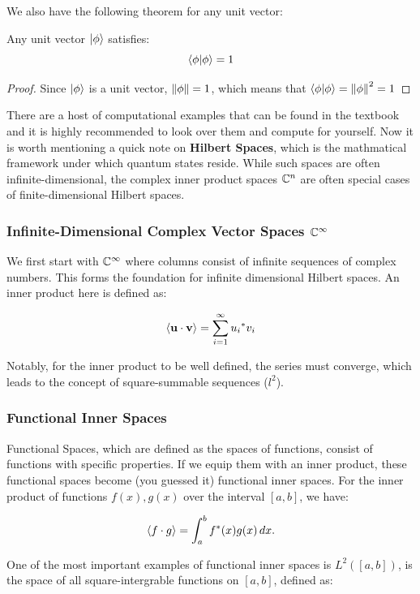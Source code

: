 \documentclass[12pt]{article}
\begin{document}
We also have the following theorem for any unit vector:

\begin{theorem}
    Any unit vector $\ket{\phi}$ satisfies:
    $$\braket{\phi}{\phi} = 1$$
\end{theorem}

\begin{proof}
    Since $\ket{\phi}$ is a unit vector, $\norm{\phi} = 1$, which means that $\braket{\phi}{\phi} = \norm{\phi}^2 = 1$
\end{proof}

There are a host of computational examples that can be found in the textbook and it is highly recommended to look over them and compute for yourself. Now it is worth mentioning a quick note on \textbf{Hilbert Spaces}, which is the mathmatical framework under which quantum states reside. While such spaces are often infinite-dimensional, the complex inner product spaces $\mathbb{C}^n$ are often special cases of finite-dimensional Hilbert spaces. 

\subsubsection*{Infinite-Dimensional Complex Vector Spaces $\mathbb{C}^\infty$}

We first start with $\mathbb{C}^\infty$ where columns consist of infinite sequences of complex numbers. This forms the foundation for infinite dimensional Hilbert spaces. An inner product here is defined as:

$$\left\langle\mathbf{u} \cdot \mathbf{v} \right\rangle = \sum_{i=1}^{\infty} {u_i}^* v_i$$

Notably, for the inner product to be well defined, the series must converge, which leads to the concept of square-summable sequences ($l^2$).

\subsubsection*{Functional Inner Spaces}

Functional Spaces, which are defined as the spaces of functions, consist of functions with specific properties. If we equip them with an inner product, these functional spaces become (you guessed it) functional inner spaces. For the inner product of functions $f(x), g(x)$ over the interval $[a, b]$, we have:

$$\left\langle f \cdot g \right\rangle = \int_{a}^{b} {f}^*(x) g(x)\,dx. $$

One of the most important examples of functional inner spaces is $L^2([a, b])$, is the space of all square-intergrable functions on $[a, b]$, defined as:
\end{document}
